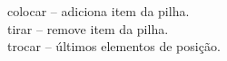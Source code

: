 \documentclass[preview]{standalone}
\begin{document}
colocar -- adiciona item da pilha.\\tirar -- remove item da pilha.\\trocar -- últimos elementos de posição.\\
\end{document}
